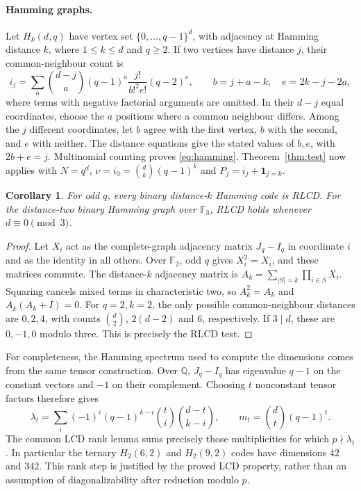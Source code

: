 \documentclass[11pt]{article}
\newtheorem{corollary}[theorem]{Corollary}
\begin{document}
\paragraph{Hamming graphs.}
Let $H_k(d,q)$ have vertex set $\{0,\ldots,q-1\}^d$, with adjacency at
Hamming distance $k$, where $1\leq k\leq d$ and $q\geq2$. If two vertices
have distance $j$, their common-neighbour count is
\begin{equation}\label{eq:hamming}
 i_j=\sum_a\binom{d-j}{a}(q-1)^a
 \frac{j!}{b!^2e!}(q-2)^e,
 \qquad b=j+a-k,\quad e=2k-j-2a,
\end{equation}
where terms with negative factorial arguments are omitted. In their $d-j$
equal coordinates, choose the $a$ positions where a common neighbour differs.
Among the $j$ different coordinates, let $b$ agree with the first vertex,
$b$ with the second, and $e$ with neither. The distance equations give the
stated values of $b,e$, with $2b+e=j$. Multinomial counting proves
\eqref{eq:hamming}. Theorem~\ref{thm:test} now applies with
$N=q^d$, $\nu=i_0=\binom dk(q-1)^k$ and $P_j=i_j+\mathbf1_{j=k}$.

\begin{corollary}\label{cor:oddq}
For odd $q$, every binary distance-$k$ Hamming code is RLCD.
For the distance-two binary Hamming graph over $\mathbb F_3$, RLCD holds
whenever $d\equiv0\pmod3$.
\end{corollary}
\begin{proof}
Let $X_i$ act as the complete-graph adjacency matrix $J_q-I_q$ in coordinate
$i$ and as the identity in all others. Over $\mathbb F_2$, odd $q$ gives
$X_i^2=X_i$, and these matrices commute. The distance-$k$ adjacency matrix
is $A_k=\sum_{|S|=k}\prod_{i\in S}X_i$. Squaring cancels mixed terms in
characteristic two, so $A_k^2=A_k$ and $A_k(A_k+I)=0$.
For $q=2,k=2$, the only possible common-neighbour distances are $0,2,4$,
with counts $\binom d2$, $2(d-2)$ and $6$, respectively. If $3\mid d$,
these are $0,-1,0$ modulo three. This is precisely the RLCD test.
\end{proof}

For completeness, the Hamming spectrum used to compute the dimensions
comes from the same tensor construction. Over $\mathbb Q$, $J_q-I_q$
has eigenvalue $q-1$ on the constant vectors and $-1$ on their complement.
Choosing $t$ nonconstant tensor factors therefore gives
\[
 \lambda_t=\sum_i(-1)^i(q-1)^{k-i}\binom ti\binom{d-t}{k-i},
 \qquad m_t=\binom dt(q-1)^t.
\]
The common LCD rank lemma sums precisely those multiplicities for which
$p\nmid\lambda_t$. In particular the ternary $H_2(6,2)$ and $H_2(9,2)$
codes have dimensions $42$ and $342$. This rank step is justified by the
proved LCD property, rather than an assumption of diagonalizability after
reduction modulo $p$.
\end{document}
